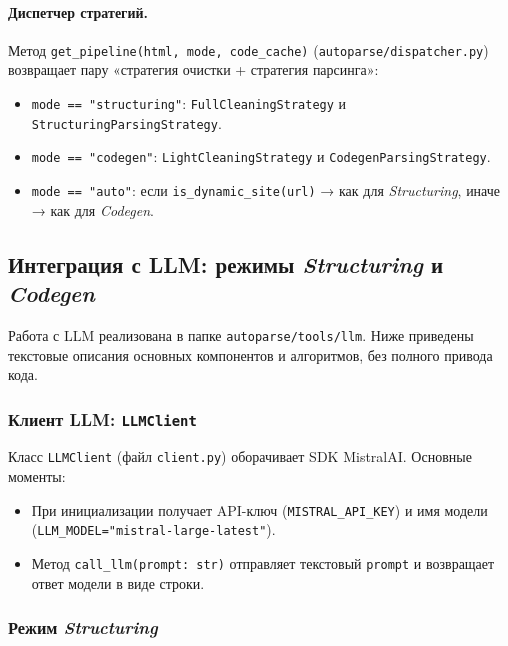 \paragraph{Диспетчер стратегий.}
Метод \texttt{get\_pipeline(html, mode, code\_cache)} (\texttt{autoparse/dispatcher.py}) возвращает пару «стратегия очистки + стратегия парсинга»:
\begin{itemize}
    \item \texttt{mode == "structuring"}: \texttt{FullCleaningStrategy} и \texttt{StructuringParsingStrategy}.
    \item \texttt{mode == "codegen"}: \texttt{LightCleaningStrategy} и \texttt{CodegenParsingStrategy}.
    \item \texttt{mode == "auto"}: если \texttt{is\_dynamic\_site(url)} → как для \emph{Structuring}, иначе → как для \emph{Codegen}.
\end{itemize}

\subsection{Интеграция с LLM: режимы \emph{Structuring} и \emph{Codegen}}
\label{subsec:solution3}

Работа с LLM реализована в папке \texttt{autoparse/tools/llm}. Ниже приведены текстовые описания основных компонентов и алгоритмов, без полного привода кода.

\subsubsection{Клиент LLM: \texttt{LLMClient}}
\label{sssec:llmclient}

Класс \texttt{LLMClient} (файл \texttt{client.py}) оборачивает SDK MistralAI. Основные моменты:
\begin{itemize}
    \item При инициализации получает API-ключ (\texttt{MISTRAL\_API\_KEY}) и имя модели (\texttt{LLM\_MODEL="mistral-large-latest"}).
    \item Метод \texttt{call\_llm(prompt: str)} отправляет текстовый \texttt{prompt} и возвращает ответ модели в виде строки.
\end{itemize}

\subsubsection{Режим \emph{Structuring}}
\label{sssec:structuring}

